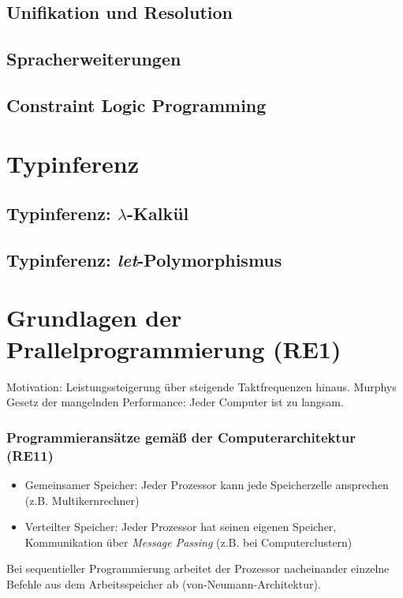 \subsection{Unifikation und Resolution}


\subsection{Spracherweiterungen}


\subsection{Constraint Logic Programming}



\section{Typinferenz}

\subsection{Typinferenz: $\lambda$-Kalkül}


\subsection{Typinferenz: \textit{let}-Polymorphismus}



\section{Grundlagen der Prallelprogrammierung (RE1)}
Motivation: Leistungssteigerung über steigende Taktfrequenzen hinaus. Murphys Gesetz der mangelnden Performance: Jeder Computer ist zu langsam.

\subsubsection{Programmieransätze gemäß der Computerarchitektur (RE11)}
\begin{itemize}
	\item Gemeinsamer Speicher: Jeder Prozessor kann jede Speicherzelle ansprechen (z.B. Multikernrechner)
	\item Verteilter Speicher: Jeder Prozessor hat seinen eigenen Speicher, Kommunikation über \textit{Message Passing} (z.B. bei Computerclustern)
\end{itemize}
Bei sequentieller Programmierung arbeitet der Prozessor nacheinander einzelne Befehle aus dem Arbeitsspeicher ab (von-Neumann-Architektur).

